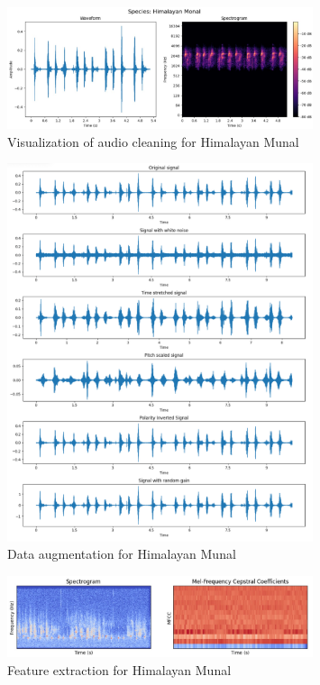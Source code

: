 \begin{figure}[h!]
    \centering
    \includegraphics[width=0.8\textwidth]{images/audio_cleaning.jpg}
    \caption{Visualization of audio cleaning for Himalayan Munal}
    \label{fig:visualization}
\end{figure}

\newpage

\begin{figure}[h!]
    \centering
    \includegraphics[width=0.8\textwidth]{images/data_aug.png}
    \caption{Data augmentation for Himalayan Munal}
    \label{fig:visualization}
\end{figure}

\begin{figure}[h!]
    \centering
    \includegraphics[width=0.8\textwidth]{images/feature_extraction.jpg}
    \caption{Feature extraction for Himalayan Munal}
    \label{fig:visualization}
\end{figure}

